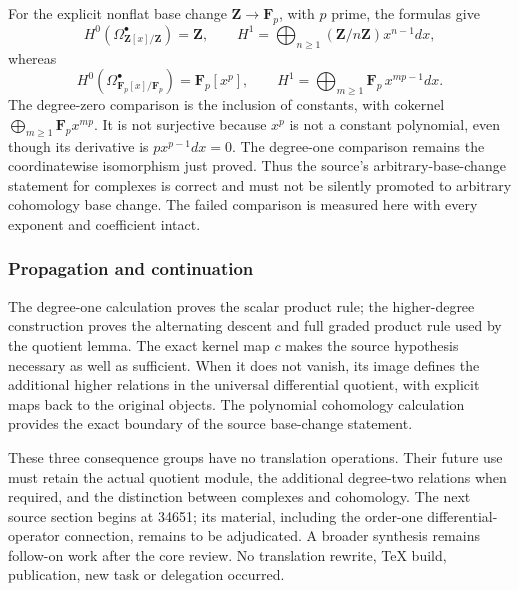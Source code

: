 For the explicit nonflat base change \(\mathbf Z\to\mathbf F_p\), with \(p\) prime, the formulas give \[
H^0(\Omega_{\mathbf Z[x]/\mathbf Z}^\bullet)=\mathbf Z,
\qquad H^1=\bigoplus_{n\ge1}(\mathbf Z/n\mathbf Z)x^{n-1}dx,
\] whereas \[
H^0(\Omega_{\mathbf F_p[x]/\mathbf F_p}^\bullet)=\mathbf F_p[x^p],
\qquad H^1=\bigoplus_{m\ge1}\mathbf F_p\,x^{mp-1}dx.
\] The degree-zero comparison is the inclusion of constants, with cokernel \(\bigoplus_{m\ge1}\mathbf F_p x^{mp}\). It is not surjective because \(x^p\) is not a constant polynomial, even though its derivative is \(p x^{p-1}dx=0\). The degree-one comparison remains the coordinatewise isomorphism just proved. Thus the source's arbitrary-base-change statement for complexes is correct and must not be silently promoted to arbitrary cohomology base change. The failed comparison is measured here with every exponent and coefficient intact.

\subsubsection{Propagation and continuation}\label{propagation-and-continuation}

The degree-one calculation proves the scalar product rule; the higher-degree construction proves the alternating descent and full graded product rule used by the quotient lemma. The exact kernel map \(c\) makes the source hypothesis necessary as well as sufficient. When it does not vanish, its image defines the additional higher relations in the universal differential quotient, with explicit maps back to the original objects. The polynomial cohomology calculation provides the exact boundary of the source base-change statement.

These three consequence groups have no translation operations. Their future use must retain the actual quotient module, the additional degree-two relations when required, and the distinction between complexes and cohomology. The next source section begins at 34651; its material, including the order-one differential-operator connection, remains to be adjudicated. A broader synthesis remains follow-on work after the core review. No translation rewrite, TeX build, publication, new task or delegation occurred.
